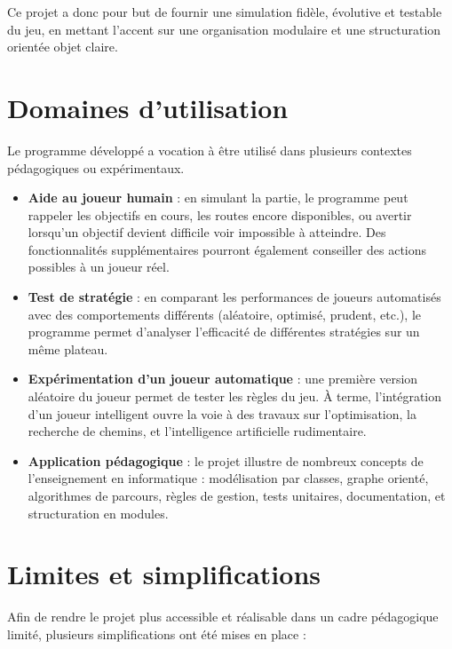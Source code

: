 \documentclass[a4paper,12pt]{report}
\begin{document}
Ce projet a donc pour but de fournir une simulation fidèle, évolutive et testable du jeu, en mettant l'accent sur
une organisation modulaire et une structuration orientée objet claire.

\section{Domaines d’utilisation}

Le programme développé a vocation à être utilisé dans plusieurs contextes pédagogiques ou expérimentaux.

\begin{itemize}
    \item \textbf{Aide au joueur humain} : en simulant la partie, le programme peut rappeler les objectifs en cours,
    les routes encore disponibles, ou avertir lorsqu’un objectif devient difficile voir impossible à atteindre.
    Des fonctionnalités supplémentaires pourront également conseiller des actions possibles à un joueur réel.

    \item \textbf{Test de stratégie} : en comparant les performances de joueurs automatisés avec des comportements
    différents (aléatoire, optimisé, prudent, etc.), le programme permet d’analyser l'efficacité de différentes
    stratégies sur un même plateau.

    \item \textbf{Expérimentation d’un joueur automatique} : une première version aléatoire du joueur permet de tester
    les règles du jeu. À terme, l’intégration d’un joueur intelligent ouvre la voie à des travaux sur l’optimisation,
    la recherche de chemins, et l’intelligence artificielle rudimentaire.

    \item \textbf{Application pédagogique} : le projet illustre de nombreux concepts de l’enseignement en informatique :
    modélisation par classes, graphe orienté, algorithmes de parcours, règles de gestion, tests unitaires,
    documentation, et structuration en modules.
\end{itemize}

\section{Limites et simplifications}

Afin de rendre le projet plus accessible et réalisable dans un cadre pédagogique limité,
plusieurs simplifications ont été mises en place :
\end{document}
